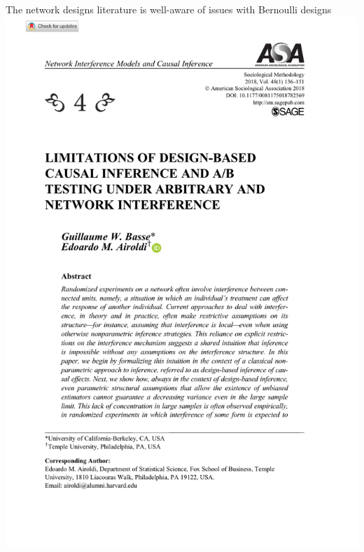 \documentclass[aspectratio=169]{beamer}
\theoremstyle{remark}
\begin{document}
\begin{frame}{The network designs literature is well-aware of issues with Bernoulli designs}
    \vfill
    \centering
    \includegraphics[height=0.9\textheight, page=1, trim={1.5cm 4cm 2cm 5cm}, clip]{./papers/airoldi.pdf}
\end{frame}
\end{document}
